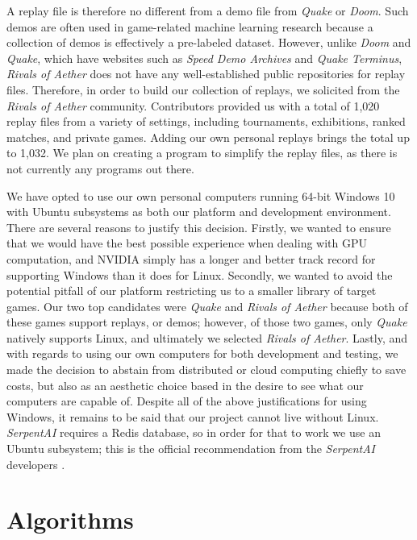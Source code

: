 A replay file is therefore no different from a demo file from {\it Quake} or {\it Doom}. Such demos are often used in game-related machine learning research because a collection of demos is effectively a pre-labeled dataset. However, unlike {\it Doom} and {\it Quake}, which have websites such as {\it Speed Demo Archives} and {\it Quake Terminus}, {\it Rivals of Aether} does not have any well-established public repositories for replay files. Therefore, in order to build our collection of replays, we solicited from the {\it Rivals of Aether} community. Contributors provided us with a total of 1,020 replay files from a variety of settings, including tournaments, exhibitions, ranked matches, and private games. Adding our own personal replays brings the total up to 1,032. We plan on creating a program to simplify the replay files, as there is not currently any programs out there.

We have opted to use our own personal computers running 64-bit Windows 10 with Ubuntu subsystems as both our platform and development environment. There are several reasons to justify this decision. Firstly, we wanted to ensure that we would have the best possible experience when dealing with GPU computation, and NVIDIA simply has a longer and better track record for supporting Windows than it does for Linux. Secondly, we wanted to avoid the potential pitfall of our platform restricting us to a smaller library of target games. Our two top candidates were {\it Quake} and {\it Rivals of Aether} because both of these games support replays, or demos; however, of those two games, only {\it Quake} natively supports Linux, and ultimately we selected {\it Rivals of Aether}. Lastly, and with regards to using our own computers for both development and testing, we made the decision to abstain from distributed or cloud computing chiefly to save costs, but also as an aesthetic choice based in the desire to see what our computers are capable of. Despite all of the above justifications for using Windows, it remains to be said that our project cannot live without Linux. {\it SerpentAI} requires a Redis database, so in order for that to work we use an Ubuntu subsystem; this is the official recommendation from the {\it SerpentAI} developers \cite{SerpentAI}.




\section{Algorithms}

